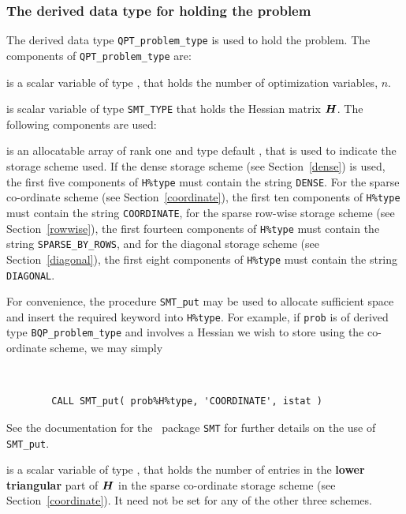 \documentclass{galahad}
\newcommand{\packagename}{BQP}
\begin{document}

\subsubsection{The derived data type for holding the problem}\label{typeprob}
The derived data type {\tt QPT\_problem\_type} is used to hold 
the problem. The components of 
{\tt QPT\_problem\_type} 
are:

\begin{description}

 is a scalar variable of type \integer, 
 that holds the number of optimization variables, $n$.  
              
 is scalar variable of type {\tt SMT\_TYPE} 
that holds the Hessian matrix ${\bm{H}}$. The following components
are used:

\begin{description}

 is an allocatable array of rank one and type default \character, that
is used to indicate the storage scheme used. If the dense storage scheme 
(see Section~\ref{dense}) is used, 
the first five components of {\tt H\%type} must contain the
string {\tt DENSE}.
For the sparse co-ordinate scheme (see Section~\ref{coordinate}), 
the first ten components of {\tt H\%type} must contain the
string {\tt COORDINATE},  
for the sparse row-wise storage scheme (see Section~\ref{rowwise}),
the first fourteen components of {\tt H\%type} must contain the
string {\tt SPARSE\_BY\_ROWS},
and for the diagonal storage scheme (see Section~\ref{diagonal}),
the first eight components of {\tt H\%type} must contain the
string {\tt DIAGONAL}.

For convenience, the procedure {\tt SMT\_put} 
may be used to allocate sufficient space and insert the required keyword
into {\tt H\%type}.
For example, if {\tt prob} is of derived type {\tt \packagename\_problem\_type}
and involves a Hessian we wish to store using the co-ordinate scheme,
we may simply
{\tt 
\begin{verbatim}
        CALL SMT_put( prob%H%type, 'COORDINATE', istat )
\end{verbatim}
}
\noindent
See the documentation for the \galahad\ package {\tt SMT} 
for further details on the use of {\tt SMT\_put}.

 is a scalar variable of type \integer, that 
holds the number of entries in the {\bf lower triangular} part of ${\bm{H}}$
in the sparse co-ordinate storage scheme (see Section~\ref{coordinate}). 
It need not be set for any of the other three schemes.


\end{description}
\end{description}
\end{document}
